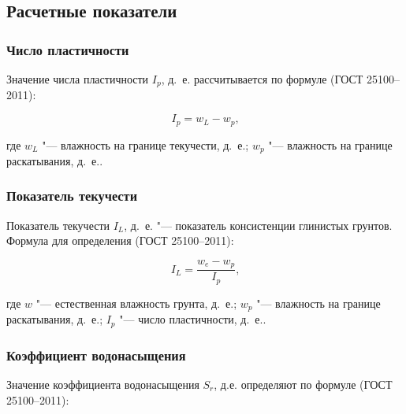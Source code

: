 
\subsection{Расчетные показатели}

\subsubsection{Число пластичности}

 Значение числа пластичности $I_p$, д.~е. рассчитывается по формуле (ГОСТ 25100--2011):

 \[ 
    I_p = w_L-w_p \text{,}
 \]

 где $w_L$ "--- влажность на границе текучести, д.~е.;
 $w_p$ "--- влажность на границе раскатывания, д.~е..
 
\subsubsection{Показатель текучести}

 Показатель текучести $I_L$, д.~е. "--- показатель консистенции глинистых грунтов.
 Формула для определения (ГОСТ 25100--2011): 

\[
   I_L = \frac{w_e - w_p}{I_p} \text{,}
\]

где $w$ "--- естественная влажность грунта, д.~е.;
$w_p$ "--- влажность на границе раскатывания, д.~е.;
$I_p$ "--- число пластичности, д.~е..

\subsubsection{Коэффициент водонасыщения}

Значение коэффициента водонасыщения $S_r$, д.е. определяют по формуле (ГОСТ 25100--2011):

